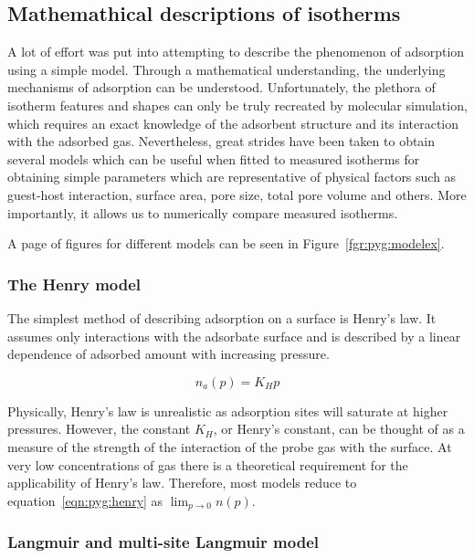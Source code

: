 \subsection{Mathemathical descriptions of isotherms}

A lot of effort was put into attempting to describe 
the phenomenon of adsorption using a simple model.
Through a mathematical understanding, the underlying 
mechanisms of adsorption can be understood.
Unfortunately, the plethora of isotherm 
features and shapes can only be truly recreated
by molecular simulation, which requires an exact
knowledge of the adsorbent structure and its interaction
with the adsorbed gas.
Nevertheless, great strides have been taken to
obtain several models which can be useful
when fitted to measured isotherms
for obtaining simple parameters which are 
representative of physical factors such as 
guest-host interaction, surface area, pore size,
total pore volume and others.
More importantly, it allows us to numerically 
compare measured isotherms. 

A page of figures for different models can be seen in 
Figure~\ref{fgr:pyg:modelex}.

\subsubsection{The Henry model}

The simplest method of describing adsorption on a 
surface is Henry’s law. It assumes only interactions
with the adsorbate surface and is described by a 
linear dependence of adsorbed amount with
increasing pressure.

\begin{equation}\label{eqn:pyg:henry}
    n_a(p) = K_H p
\end{equation}

Physically, Henry's law is unrealistic as adsorption sites
will saturate at higher pressures. However, the constant \(K_H\),
or Henry’s constant, can be thought of as a measure of the strength
of the interaction of the probe gas with the surface. At very 
low concentrations of gas there is a 
theoretical requirement for the applicability of Henry's law.
Therefore, most models reduce to equation~\ref{eqn:pyg:henry}
as \(\lim_{p \to 0} n(p)\).

\subsubsection{Langmuir and multi-site Langmuir model}


